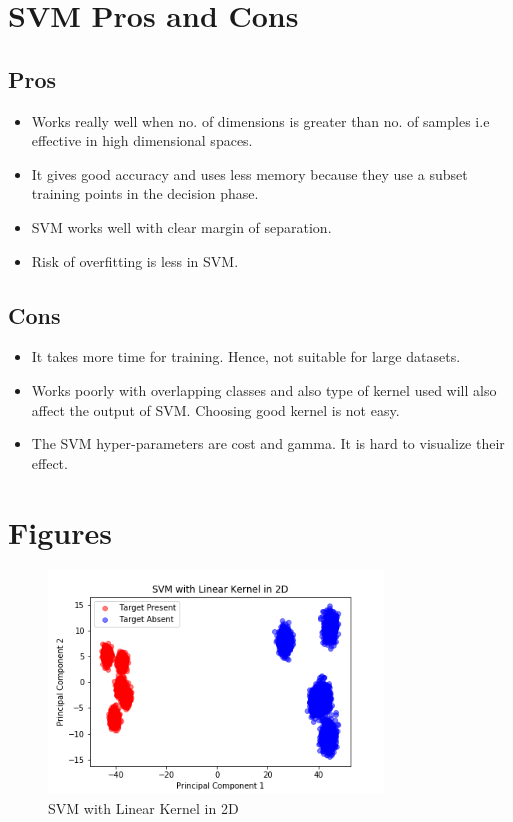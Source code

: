 \documentclass[journal,12pt,twocolumn]{IEEEtran}
\begin{document}
\section{SVM Pros and Cons}
\subsection{Pros}
\begin{itemize}
\item Works really well when no. of dimensions is greater than no. of samples i.e effective in high dimensional spaces.
\item It gives good accuracy and uses less memory because they use a subset training points in the decision phase.
\item SVM works well with clear margin of separation.
\item Risk of overfitting is less in SVM.
\end{itemize}


\subsection{Cons}
\begin{itemize}
\item It takes more time for training. Hence, not suitable for large datasets.
\item Works poorly with overlapping classes and also type of kernel used will also affect the output of SVM. Choosing good kernel is not easy.
\item The SVM hyper-parameters are cost and gamma. It is hard to visualize their effect.
\end{itemize}

\section{Figures}
\begin{figure}[!h]
\begin{center}
\includegraphics[width=3.5in]{figs/LinSVM_2D.png}
\end{center}
\caption{SVM with Linear Kernel in 2D}
\label{fig: 2D Plot}
\end{figure}
\end{document}
